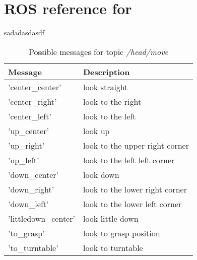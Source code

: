\section{ROS reference for \hobbit{}}
sadadasdasdf
\begin{table}
	\centering
	\begin{tabular}{l l}
		\toprule
		Message              & Description                    \\
		\midrule
		'center\_center'     & look straight                  \\
		'center\_right'      & look to the right              \\
		'center\_left'       & look to the left               \\
		'up\_center'         & look up                        \\
		'up\_right'          & look to the upper right corner \\
		'up\_left'           & look to the left left corner   \\
		'down\_center'       & look down                      \\
		'down\_right'        & look to the lower right corner \\
		'down\_left'         & look to the lower left corner  \\
		'littledown\_center' & look little down               \\
		'to\_grasp'          & look to grasp position         \\
		'to\_turntable'      & look to turntable              \\
		\bottomrule
	\end{tabular}
	\caption{Possible messages for topic \textit{/head/move}}
	\label{tab:headMoveCommands}
\end{table}